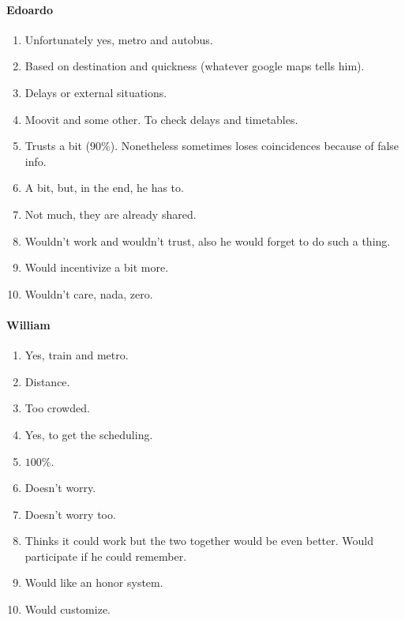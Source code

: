\documentclass[a4paper, 11pt, twocolumn]{article}
\begin{document}
\paragraph*{Edoardo}
\begin{enumerate}
	\item Unfortunately yes, metro and autobus.
	\item Based on destination and quickness (whatever google maps tells him).
	\item Delays or external situations.
	\item Moovit and some other. To check delays and timetables.
	\item Trusts a bit ($90\%$). Nonetheless sometimes loses coincidences because of false info.
	\item A bit, but, in the end, he has to.
	\item Not much, they are already shared.
	\item Wouldn't work and wouldn't trust, also he would forget to do such a thing.
	\item Would incentivize a bit more.
	\item Wouldn't care, nada, zero.
\end{enumerate}

\paragraph*{William}
\begin{enumerate}
	\item Yes, train and metro.
	\item Distance.
	\item Too crowded.
	\item Yes, to get the scheduling.
	\item $100\%$.
	\item Doesn't worry.
	\item Doesn't worry too.
	\item Thinks it could work but the two together would be even better. Would participate if he could remember.
	\item Would like an honor system.
	\item Would customize.
\end{enumerate}
\end{document}
